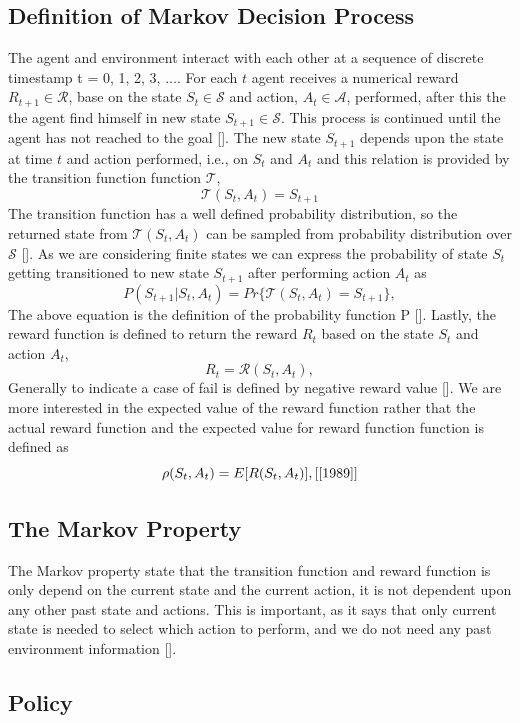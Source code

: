 \documentclass[12pt]{article}
\begin{document}
\subsection{Definition of Markov Decision Process}
The agent and environment interact with each other at a sequence of discrete timestamp t = 0, 1, 2, 3, $\dots$. For each $t$ agent receives a numerical reward $R_{t+1} \in \mathcal{R}$, base on the state $S_t \in \mathcal{S}$ and action, $A_t \in \mathcal{A}$, performed, after this the the agent find himself in new state $S_{t+1} \in \mathcal{S}$. This process is continued until the agent has not reached to the goal [\cite{Sutton_Barto_2020}]. The new state $S_{t+1}$ depends upon the state at time $t$ and action performed, i.e., on $S_t$ and  $A_t$ and this relation is provided by the transition function function $\mathcal{T}$, $$\mathcal{T}(S_t, A_t) = S_{t+1}$$ The transition function has a well defined probability distribution, so the returned state from $\mathcal{T}(S_t, A_t)$ can be sampled from probability distribution over $\mathcal{S}$ [\cite{1989}]. As we are considering finite states we can express the probability of state $S_t$ getting transitioned to new state $S_{t+1}$ after performing action $A_t$ as $$P(S_{t+1} | S_t, A_t) = Pr\{\mathcal{T}(S_t, A_t) = S_{t+1}\},$$ The above equation is the definition of the probability function P [\cite{Sutton_Barto_2020}]. Lastly, the reward function is defined to return the reward $R_t$ based on the state $S_t$ and action $A_t$, $$R_t = \mathcal{R}(S_t, A_t),$$ Generally to indicate a case of fail is defined by negative reward value [\cite{1989}]. We are more interested in the expected value of the reward function rather that the actual reward function and the expected value for reward function function is defined as $$\rho(S_t, A_t) = E[R(S_t, A_t)], \text{[\cite{1989}]}$$

\subsection{The Markov Property}

The Markov property state that the transition function and reward function is only depend on the current state and the current action, it is not dependent upon any other past state and actions. This is important, as it says that only current state is needed to select which action to perform, and we do not need any past environment information [\cite{1989}]. 

\subsection{Policy}
\end{document}
